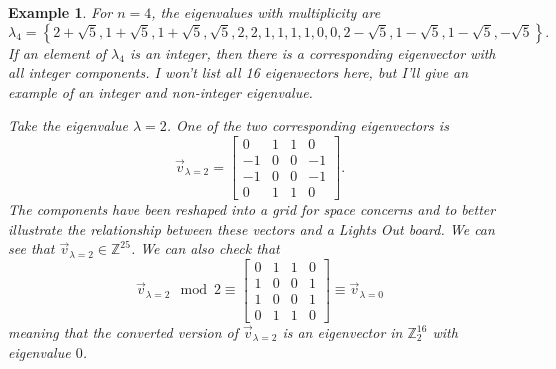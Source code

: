 \documentclass[12pt]{article}
\newtheorem{example}{Example}
\newcommand{\Z}{\mathbb{Z}}
\begin{document}
	\begin{example}
		For $n=4$, the eigenvalues with multiplicity are
		\begin{equation*}
		\lambda_4 = \left\{2+\sqrt{5}, 1+\sqrt{5}, 1+\sqrt{5}, \sqrt{5},
		2,2,1,1,1,1,0,0,2-\sqrt{5},1-\sqrt{5},1-\sqrt{5},-\sqrt{5}\right\}.
		\end{equation*}
		If an element of $\lambda_4$ is an integer, then there is a corresponding
		eigenvector with all integer components.
		I won't list all 16 eigenvectors here, but I'll give an example of an integer
		and non-integer eigenvalue.
		
		Take the eigenvalue $\lambda=2$.
		One of the two corresponding eigenvectors is
		\begin{equation*}
		\vec{v}_{\lambda=2} = \begin{bmatrix}
		0  & 1 & 1 & 0  \\
		-1 & 0 & 0 & -1 \\
		-1 & 0 & 0 & -1 \\
		0  & 1 & 1 & 0
		\end{bmatrix}.
		\end{equation*}
		The components have been reshaped into a grid for space concerns and to
		better illustrate the relationship between these vectors and a \textit{Lights
			Out} board.
		We can see that $\vec{v}_{\lambda=2} \in \Z^{25}$.
		We can also check that
		\begin{equation*}
		\vec{v}_{\lambda=2} \mod 2 \equiv \begin{bmatrix}
		0 & 1 & 1 & 0 \\
		1 & 0 & 0 & 1 \\
		1 & 0 & 0 & 1 \\
		0 & 1 & 1 & 0
		\end{bmatrix} \equiv \vec{v}_{\lambda=0}
		\end{equation*}
		meaning that the converted version of $\vec{v}_{\lambda=2}$ is an eigenvector
		in $\Z_2^{16}$ with eigenvalue $0$.
		

\end{example}
\end{document}
